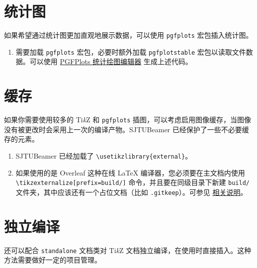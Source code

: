 \documentclass[
    UTF8,
    heading=true,
    12pt,
    a4paper
]{ctexrep}
\newenvironment{commentlist}
{\begin{enumerate}\small}
{\end{enumerate}}
\newcommand{\cls}[1]{\texttt{#1}}
\newcommand{\pkg}[1]{\texttt{#1}}
\def\themename{\textsf{SJTUBeamer}}
\begin{document}
\section{统计图}

如果希望通过统计图更加直观地展示数据，可以使用 \pkg{pgfplots} 宏包插入统计图。


\begin{commentlist}
  \item 需要加载 \pkg{pgfplots} 宏包，必要时额外加载
  \pkg{pgfplotstable} 宏包以读取文件数据。可以使用
  \href{https://logcreative.github.io/
    PGFPlotsEdt/}{PGFPlots 统计绘图编辑器}
  生成上述代码。
\end{commentlist}

\section{缓存}

如果你需要使用较多的 Ti\emph{k}Z 和 \pkg{pgfplots}
插图，可以考虑启用图像缓存，当图像没有被更改时会采用上一次的编译产物。\themename{}
已经保护了一些不必要缓存的元素。


\begin{commentlist}
  \item \themename{} 已经加载了
  \verb"\usetikzlibrary{external}"。
  \item[\faExclamationTriangle] 如果使用的是 Overleaf
  这种在线 \LaTeX{} 编译器，您必须要在主文档内使用
  \verb"\tikzexternalize[prefix=build/]" 命令，并且要在同级目录下新建
  \verb"build/" 文件夹，其中应该还有一个占位文档（比如
  \verb".gitkeep"）。可参见
  \href{https://www.overleaf.com/learn/latex/
  Questions/I_have_a_lot_of_tikz%
  matlab2tikz_or_pgfplots_figures%
  so_I%
  timeout._Can_I_externalise_
  my_figures%
\end{commentlist}

\section{独立编译}

还可以配合 \cls{standalone} 文档类对 Ti\emph{k}Z
文档独立编译，在使用时直接插入。这种方法需要做好一定的项目管理。

\end{document}
